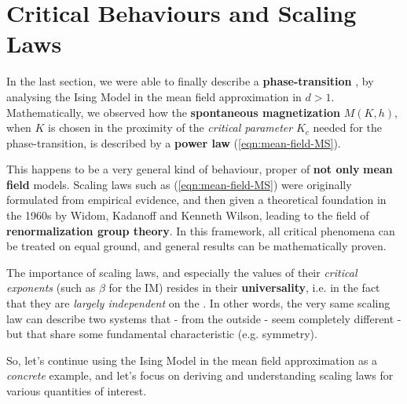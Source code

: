 \documentclass[../../main.tex]{subfiles}
\begin{document}
\section{Critical Behaviours and Scaling Laws}

In the last section, we were able to finally describe a \textbf{phase-transition} , by analysing the Ising Model in the mean field approximation in $d > 1$. Mathematically, we observed how the \textbf{spontaneous magnetization} $M(K, h)$, when $K$ is chosen in the proximity of the \textit{critical parameter} $K_c$ needed for the phase-transition, is described by a \textbf{power law} (\ref{eqn:mean-field-MS}).

\medskip

This happens to be a very general kind of behaviour, proper of \textbf{not only} \textbf{mean field} models.
Scaling laws such as (\ref{eqn:mean-field-MS}) were originally formulated from empirical evidence, and then given a theoretical foundation in the 1960s by Widom, Kadanoff and Kenneth Wilson, leading to the field of \textbf{renormalization group theory}. In this framework, all critical phenomena can be treated on equal ground, and general results can be mathematically proven. 

\medskip

The importance of scaling laws, and especially the values of their \textit{critical exponents} (such as $\beta$ for the IM) resides in their \textbf{universality}, i.e. in the fact that they are \textit{largely independent} on the . In other words, the very same scaling law can describe two systems that - from the outside - seem completely different - but that share some fundamental characteristic (e.g. symmetry). 

\medskip

So, let's continue using the Ising Model in the mean field approximation as a \textit{concrete} example, and let's focus on deriving and understanding scaling laws for various quantities of interest.
\end{document}

